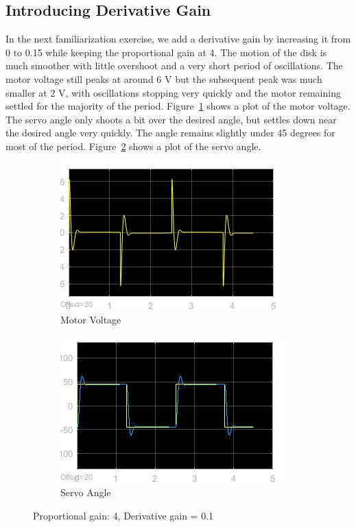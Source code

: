 \documentclass[12pt]{article}
\begin{document}
\subsection*{Introducing Derivative Gain} %
In the next familiarization exercise, we add a derivative gain by increasing it from 0 to 0.15 while keeping the proportional gain at 4. The motion of the disk is much smoother with little overshoot and a very short period of oscillations. The motor voltage still peaks at around 6 V but the subsequent peak was much smaller at 2 V, with oscillations stopping very quickly and the motor remaining settled for the majority of the period. Figure~\ref{fig:xi_volt} shows a plot of the motor voltage. The servo angle only shoots a bit over the desired angle, but settles down near the desired angle very quickly. The angle remains slightly under 45 degrees for most of the period. Figure~\ref{fig:xi_angle} shows a plot of the servo angle.
\begin{figure}[h!]
    \centering
    \begin{subfigure}[b]{0.46\textwidth}
        \includegraphics[width=\textwidth]{xi_voltage}
        \caption{\label{fig:xi_volt}Motor Voltage}
    \end{subfigure}
    \begin{subfigure}[b]{0.46\textwidth}
        \includegraphics[width=\textwidth]{xi_angle}
        \caption{\label{fig:xi_angle}Servo Angle}    
    \end{subfigure}
    \caption{\label{fig:xi} Proportional gain: 4, Derivative gain = 0.1}
\end{figure}
\end{document}
